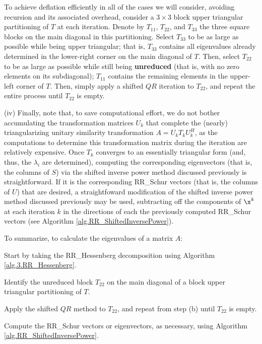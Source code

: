 To achieve deflation efficiently in all of the cases we will consider, avoiding recursion and its associated overhead,
consider a $3\times 3$ block upper triangular partitioning of $T$ at each iteration.
Denote by $T_{11}$, $T_{22}$, and $T_{33}$ the three square blocks on the main diagonal in
this partitioning.  Select $T_{33}$ to be as large as possible
while being upper triangular; that is, $T_{33}$ contains all eigenvalues already determined
in the lower-right corner on the main diagonal of $T$.  Then, select $T_{22}$
to be as large as possible while still being {\bf unreduced} (that is, with
no zero elements on its subdiagonal); $T_{11}$ contains the remaining elements in the upper-left corner of $T$.
Then, simply apply a shifted $QR$ iteration to $T_{22}$, and repeat the entire process until $T_{22}$ is empty.\label{par:T22isolation}\vskip0.1in

\noindent (iv)
Finally, note that, to save computational effort, we do not bother accumulating the transformation matrices $U_k$ that
complete the (nearly) triangularizing unitary similarity transformation $A=U_k T_k U_k^H$, as the computations to determine this transformation matrix
during the iteration are relatively expensive.  
Once $T_k$ converges to an essentially triangular form (and, thus, the $\lambda_i$ are determined), computing the corresponding eigenvectors (that is, the columns of $S$) via the shifted inverse power method discussed previously is straightforward.
If it is the corresponding RR_Schur vectors (that is, the columns of $U$) that are desired, a straightfoward modification of the shifted inverse power method discussed previously may be used,
subtracting off the components of $\x^{k}$ at each iteration $k$ in the directions of each the previously computed RR_Schur vectors (see Algorithm \ref{alg.RR_ShiftedInversePower}). \vskip0.08in

\noindent To summarize, to calculate the eigenvalues of a matrix $A$:
\beginmylistb
\item[(a)] Start by taking the RR_Hessenberg decomposition using Algorithm \ref{alg.3.RR_Hessenberg}.
\item[(b)] Identify the unreduced block $T_{22}$ on the main diagonal of a block upper triangular partitioning of $T$.
\item[(c)] Apply the shifted $QR$ method to $T_{22}$, and repeat from step (b) until $T_{22}$ is empty. 
\item[(d)] Compute the RR_Schur vectors or eigenvectors, as necessary, using Algorithm \ref{alg.RR_ShiftedInversePower}.
\endmylist \vskip0.08in

